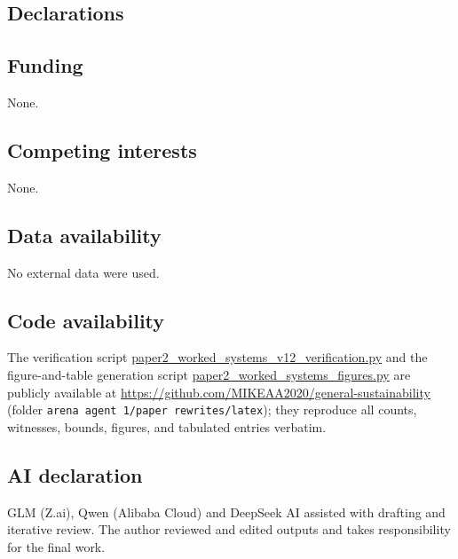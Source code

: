 \documentclass[10pt,twocolumn]{article}
\theoremstyle{definition}
\begin{document}
\subsection*{Declarations}

\subsection*{Funding}
None.

\subsection*{Competing interests}
None.

\subsection*{Data availability}
No external data were used.

\subsection*{Code availability}
The verification script \url{paper2_worked_systems_v12_verification.py}
and the figure-and-table generation script
\url{paper2_worked_systems_figures.py} are publicly available at
\url{https://github.com/MIKEAA2020/general-sustainability} (folder
\texttt{arena agent 1/paper rewrites/latex}); they reproduce all
counts, witnesses, bounds, figures, and tabulated entries verbatim.

\subsection*{AI declaration}
GLM (Z.ai), Qwen (Alibaba Cloud) and DeepSeek AI assisted with drafting
and iterative review. The author reviewed and edited outputs and takes
responsibility for the final work.
\end{document}
